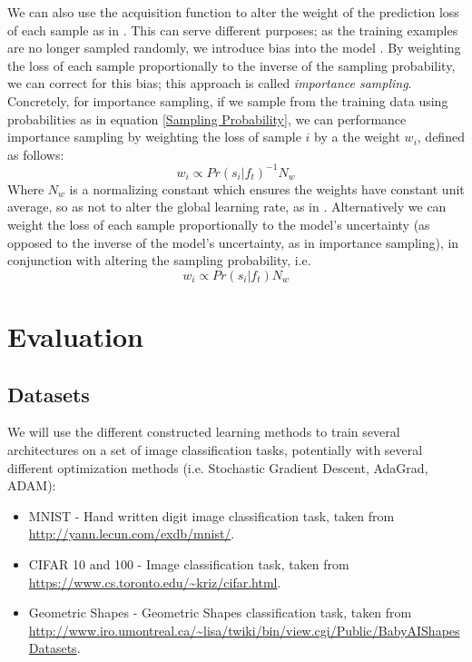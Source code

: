 \documentclass[a4paper,10pt]{article}
\begin{document}
We can also use the acquisition function to alter the weight of the prediction loss of each sample as in \cite{Katharopoulos 2018}. This can serve different purposes; as the training examples are no longer sampled randomly, we introduce bias into the model \cite{Chang 18}. By weighting the loss of each sample proportionally to the inverse of the sampling probability, we can correct for this bias; this approach is called \textit{importance sampling}. Concretely, for importance sampling, if we sample from the training data using probabilities as in equation \ref{Sampling Probability}, we can performance importance sampling by weighting the loss of sample $i$ by a the weight $w_i$, defined as follows:
\begin{equation}
w_i \propto Pr(s_i|f_t)^{-1} N_w
\end{equation}
Where $N_w$ is a normalizing constant which ensures the weights have constant unit average, so as not to alter the global learning rate, as in \cite{Chang 18}.
Alternatively we can weight the loss of each sample proportionally to the model's uncertainty (as opposed to the inverse of the model's uncertainty, as in importance sampling), in conjunction with altering the sampling probability, i.e.
\begin{equation}
w_i \propto Pr(s_i|f_t) N_w
\end{equation}

\section{Evaluation}
\subsection*{Datasets}
We will use the different constructed learning methods to train several architectures on a set of image classification tasks, potentially with several different optimization methods (i.e. Stochastic Gradient Descent, AdaGrad, ADAM):
\begin{itemize}
	\item MNIST - Hand written digit image classification task, taken from \url{http://yann.lecun.com/exdb/mnist/}.
	\item CIFAR 10 and 100 -  Image classification task, taken from \url{https://www.cs.toronto.edu/~kriz/cifar.html}. 
	\item Geometric Shapes - Geometric Shapes classification task, taken from \url{http://www.iro.umontreal.ca/~lisa/twiki/bin/view.cgi/Public/BabyAIShapesDatasets}. 
\end{itemize}
\end{document}
